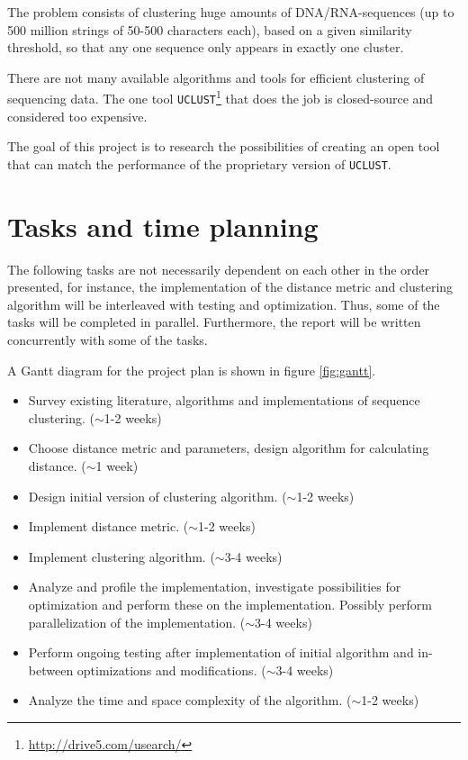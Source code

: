 \documentclass[11pt,a4paper]{article}
\begin{document}
The problem consists of clustering huge amounts of DNA/RNA-sequences (up to 500
million strings of 50-500 characters each), based on a given similarity
threshold, so that any one sequence only appears in exactly one cluster.
 
There are not many available algorithms and tools for efficient clustering of
sequencing data. The one tool
\texttt{UCLUST}\footnote{\url{http://drive5.com/usearch/}} that does the job is
closed-source and considered too expensive. %

The goal of this project is to research the possibilities of creating an open
tool that can match the performance of the proprietary version of
\texttt{UCLUST}.


\section{Tasks and time planning}
The following tasks are not necessarily dependent on each other in the order
presented, for instance, the implementation of the distance metric and
clustering algorithm will be interleaved with testing and optimization.
Thus, some of the tasks will be completed in parallel. Furthermore, the report
will be written concurrently with some of the tasks.

A Gantt diagram for the project plan is shown in figure \ref{fig:gantt}.

\begin{itemize}
  \item Survey existing literature, algorithms and implementations of sequence
    clustering. ($\sim$1-2 weeks)

  \item Choose distance metric and parameters, design algorithm for calculating
    distance. ($\sim$1 week)

  \item Design initial version of clustering algorithm. ($\sim$1-2 weeks)

  \item Implement distance metric. ($\sim$1-2 weeks)

  \item Implement clustering algorithm. ($\sim$3-4 weeks)

  \item Analyze and profile the implementation, investigate possibilities for
    optimization and perform these on the implementation. Possibly perform
    parallelization of the implementation. ($\sim$3-4 weeks)

  \item Perform ongoing testing after implementation of initial algorithm and
    in-between optimizations and modifications. ($\sim$3-4 weeks)

  \item Analyze the time and space complexity of the algorithm. ($\sim$1-2
    weeks)
\end{itemize}
\end{document}
